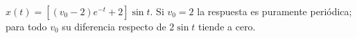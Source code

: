 $x(t)=[(v_0-2)e^{-t}+2]\sin t$. Si $v_0=2$ la respuesta es puramente periódica; para todo $v_0$ su diferencia respecto de $2\sin t$ tiende a cero.
